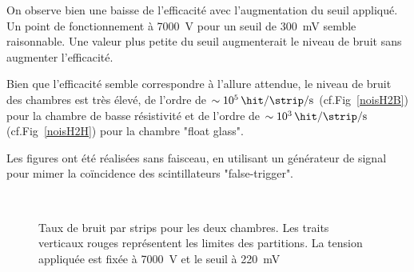 On observe bien une baisse de l'efficacité avec l'augmentation du seuil appliqué. Un point de fonctionnement à \SI{7000}{\volt} pour un seuil de \SI{300}{\milli\volt} semble raisonnable. Une valeur plus petite du seuil augmenterait le niveau de bruit sans augmenter l'efficacité.

Bien que l'efficacité semble correspondre à l'allure attendue, le niveau de bruit des chambres est très élevé, de l'ordre de $\sim\SI{e5}{\hit\per\strip\per\second}$ (cf.Fig~\ref{noisH2B}) pour la chambre de basse résistivité et de l'ordre de $\sim\SI{e3}{\hit\per\strip\per\second}$ (cf.Fig~\ref{noisH2H}) pour la chambre "float glass". 

Les figures ont été réalisées sans faisceau, en utilisant un générateur de signal pour mimer la coïncidence des scintillateurs "false-trigger".
\vspace*{0.4cm}
\begin{figure}[ht!]
	\centering
	\\
	\vspace*{1.3cm}
	\caption{Taux de bruit par strips pour les deux chambres. Les traits verticaux rouges représentent les limites des partitions. La tension appliquée est fixée à \SI{7000}{\volt} et le seuil à \SI{220}{\milli\volt}}
\end{figure}

